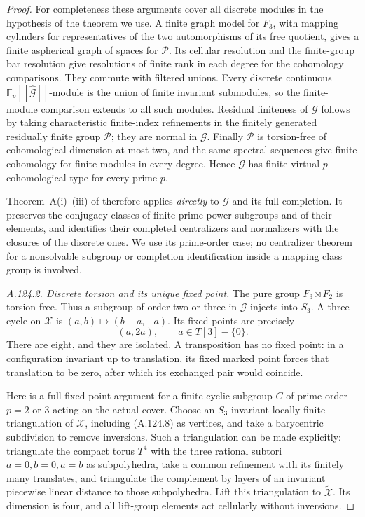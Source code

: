 \begin{proof}
For completeness these arguments cover all discrete modules in the
hypothesis of the theorem we use. A finite graph model for \(F_3\),
with mapping cylinders for representatives of the two automorphisms
of its free quotient, gives a finite aspherical graph of spaces for
\(\mathcal P\). Its cellular resolution and the finite-group bar
resolution give resolutions of finite rank in each degree for the
cohomology comparisons. They commute with filtered unions. Every
discrete continuous \(\mathbb F_p[[\widehat{\mathcal G}]]\)-module
is the union of finite invariant submodules, so the finite-module
comparison extends to all such modules. Residual finiteness of
\(\mathcal G\) follows by taking characteristic finite-index
refinements in the finitely generated residually finite group
\(\mathcal P\); they are normal in \(\mathcal G\).
Finally \(\mathcal P\) is torsion-free of cohomological dimension
at most two, and the same spectral sequences give finite cohomology
for finite modules in every degree. Hence \(\mathcal G\) has finite
virtual \(p\)-cohomological type for every prime \(p\).

Theorem~A(i)--(iii) of \cite{BoggiZalesskii2025} therefore applies
\emph{directly} to \(\mathcal G\) and its full completion. It
preserves the conjugacy classes of finite prime-power subgroups and
of their elements, and identifies their completed centralizers and
normalizers with the closures of the discrete ones. We use its
prime-order case; no centralizer theorem for a nonsolvable subgroup
or completion identification inside a mapping class group is involved.

\emph{A.124.2. Discrete torsion and its unique fixed point.}
The pure group \(F_3\rtimes F_2\) is torsion-free. Thus a subgroup
of order two or three in \(\mathcal G\) injects into \(S_3\).
A three-cycle on \(\mathcal X\) is
\((a,b)\mapsto(b-a,-a)\). Its fixed points are precisely
\[
           (a,2a),\qquad a\in T[3]-\{0\}.
 \tag{A.124.8}
\]
There are eight, and they are isolated. A transposition has no
fixed point: in a configuration invariant up to translation, its
fixed marked point forces that translation to be zero, after which
its exchanged pair would coincide.

Here is a full fixed-point argument for a finite cyclic subgroup
\(C\) of prime order \(p=2\) or \(3\) acting on the actual cover.
Choose an \(S_3\)-invariant locally finite triangulation of
\(\mathcal X\), including (A.124.8) as vertices, and take a barycentric
subdivision to remove inversions. Such a triangulation can be made
explicitly: triangulate the compact torus \(T^4\) with the three
rational subtori \(a=0,b=0,a=b\) as subpolyhedra, take a common
refinement with its finitely many translates, and triangulate the
complement by layers of an invariant piecewise linear distance to
those subpolyhedra. Lift this triangulation to
\(\widetilde{\mathcal X}\). Its dimension is four, and all lift-group
elements act cellularly without inversions.


\end{proof}
